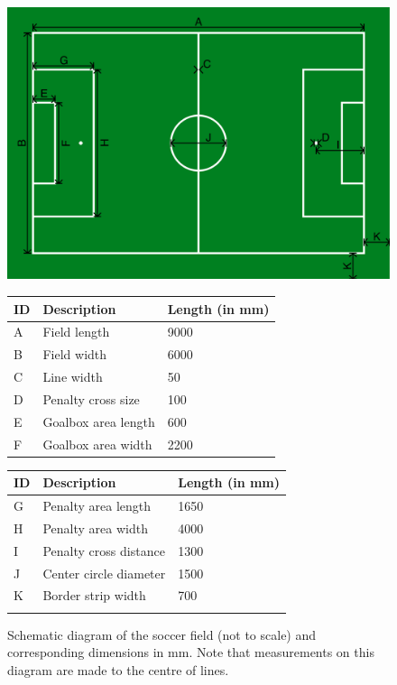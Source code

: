 \begin{figure}[b!]
	\centering
	\centerline{\includegraphics[width=\columnwidth]{figs/fieldDimensions2020.pdf}}
	\vspace{1ex}
	\begin{tabular}{| l | l | l |}
		ID & Description & Length (in mm) \\
		\hline \hline
		A & Field length & 9000 \\
		\hline
		B & Field width & 6000 \\
		\hline
		C & Line width & 50 \\
		\hline
		D & Penalty cross size & 100 \\
		\hline
		E & Goalbox area length & 600 \\
		\hline
		F & Goalbox area width & 2200 \\
	\end{tabular}
	\begin{tabular}{|l|l|l|}
		ID & Description & Length (in mm) \\
		\hline \hline
		G & Penalty area length & 1650 \\
		\hline
		H & Penalty area width & 4000 \\
		\hline
		I & Penalty cross distance & 1300 \\
		\hline
		J & Center circle diameter & 1500 \\
		\hline
		K & Border strip width & 700 \\
		\hline
		&  &  \\
	\end{tabular}
	\caption{Schematic diagram of the   soccer field (not to scale) and corresponding dimensions in mm. Note that measurements on this diagram are made to the centre of lines.} \label{fig:field_dim}
\end{figure}


